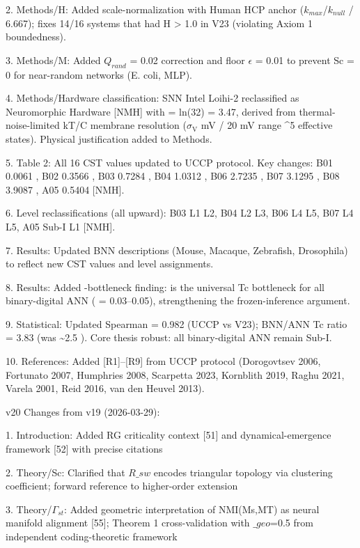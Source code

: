 \documentclass[a4paper,12pt]{article}
\begin{document}
2. Methods/H: Added scale-normalization with Human HCP anchor ($k_{max}$/$k_{null}$ / 6.667); fixes 14/16 systems that had H > 1.0 in V23 (violating Axiom 1 boundedness).

3. Methods/M: Added $Q_{rand}$ = 0.02 correction and floor $\epsilon$ = 0.01 to prevent Sc = 0 for near-random networks (E. coli, MLP).

4. Methods/Hardware classification: SNN Intel Loihi-2 reclassified as Neuromorphic Hardware [NMH] with  \alpha  = ln(32) = 3.47, derived from thermal-noise-limited kT/C membrane resolution ($\sigma_{\text{V}}$   mV / 20 mV range  ^5 effective states). Physical justification added to Methods.

5. Table 2: All 16 CST values updated to UCCP protocol. Key changes: B01 0.0061 , B02 0.3566 , B03 0.7284 , B04 1.0312 , B06 2.7235 , B07 3.1295 , B08 3.9087 , A05 0.5404  [NMH].

6. Level reclassifications (all upward): B03 L1 \rightarrow L2, B04 L2 \rightarrow L3, B06 L4 \rightarrow L5, B07 L4 \rightarrow L5, A05 Sub-I \rightarrow L1 [NMH].

7. Results: Updated BNN descriptions (Mouse, Macaque, Zebrafish, Drosophila) to reflect new CST values and level assignments.

8. Results: Added  \Psi -bottleneck finding:  \Psi  is the universal Tc bottleneck for all binary-digital ANN ( \Psi  = 0.03--0.05), strengthening the frozen-inference argument.

9. Statistical: Updated Spearman  \rho  = 0.982 (UCCP vs V23); BNN/ANN Tc ratio = 3.83 \times  (was \textasciitilde{}2.5 \times ). Core thesis robust: all binary-digital ANN remain Sub-I.

10. References: Added [R1]--[R9] from UCCP protocol (Dorogovtsev 2006, Fortunato 2007, Humphries 2008, Scarpetta 2023, Kornblith 2019, Raghu 2021, Varela 2001, Reid 2016, van den Heuvel 2013).

v20 Changes from v19 (2026-03-29):

1. Introduction: Added RG criticality context [51] and dynamical-emergence framework [52] with precise citations

2. Theory/Sc: Clarified that $R\_{sw}$ encodes triangular topology via clustering coefficient; forward reference to higher-order extension

3. Theory/$\Gamma_{st}$: Added geometric interpretation of NMI(Ms,MT) as neural manifold alignment [55]; Theorem 1 cross-validation with  \gamma *$\_geo$=0.5 from independent coding-theoretic framework
\end{document}
